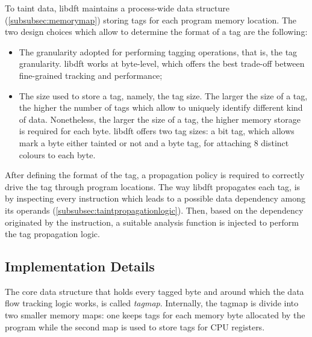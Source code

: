 \documentclass[LaM,binding=0.6cm]{sapthesis}
\begin{document}
To taint data, libdft maintains a process-wide data structure (\autoref{subsubsec:memorymap}) storing tags for each program memory location. The two design choices which allow to determine the format of a tag are the following:
\begin{itemize}
\item The granularity adopted for performing tagging operations, that is, the tag granularity. libdft works at byte-level, which offers the best trade-off between fine-grained tracking and performance;
\item The size used to store a tag, namely, the tag size. The larger the size of a tag, the higher the number of tags which allow to uniquely identify different kind of data. Nonetheless, the larger the size of a tag, the higher memory storage is required for each byte. libdft offers two tag sizes: a bit tag, which allows mark a byte either tainted or not and a byte tag, for attaching $8$ distinct colours to each byte.
\end{itemize}
After defining the format of the tag, a propagation policy is required to correctly drive the tag through program locations. The way libdft propagates each tag, is by inspecting every instruction which leads to a possible data dependency among its operands (\autoref{subsubsec:taintpropagationlogic}). Then, based on the dependency originated by the instruction, a suitable analysis function is injected to perform the tag propagation logic.

\subsection{Implementation Details}
The core data structure that holds every tagged byte and around which the data flow tracking logic works, is called \textit{tagmap}. Internally, the tagmap is divide into two smaller memory maps: one keeps tags for each memory byte allocated by the program while the second map is used to store tags for CPU registers.
\end{document}
